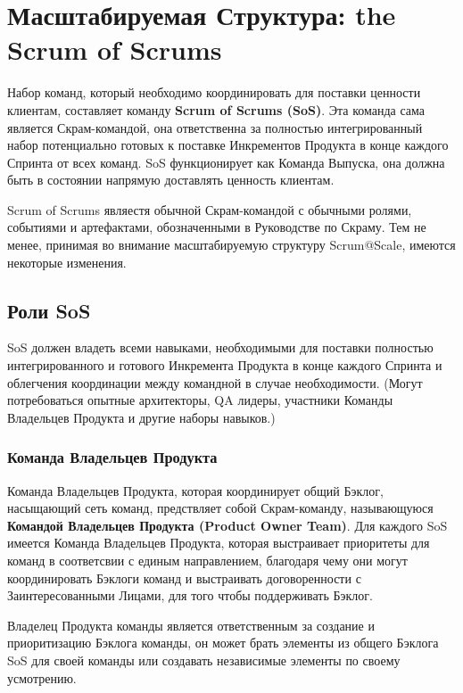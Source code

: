\documentclass[12pt,a4paper,parskip=full]{scrartcl}
\begin{document}
\section{Масштабируемая Структура: the Scrum of Scrums}


Набор команд, который необходимо координировать для поставки ценности клиентам, составляет команду  \textbf{Scrum of Scrums (SoS)}. Эта команда сама является Скрам-командой, она ответственна за полностью интегрированный набор потенциально готовых к поставке Инкрементов Продукта в конце каждого Спринта от всех команд.       SoS функционирует как Команда Выпуска, она должна быть в состоянии напрямую доставлять ценность клиентам.

Scrum of Scrums являестя обычной Скрам-командой с обычными ролями, событиями и артефактами, обозначенными в Руководстве по Скраму. Тем не менее, принимая во внимание масштабируемую структуру Scrum@Scale, имеются некоторые изменения.

\subsection{Роли SoS}

SoS должен владеть всеми навыками, необходимыми для поставки полностью интегрированного и готового Инкремента Продукта в конце каждого Спринта и облегчения координации между командной в случае необходимости. (Могут потребоваться опытные архитекторы, QA лидеры, участники Команды Владельцев Продукта и другие наборы навыков.)  

\subsubsection{Команда Владельцев Продукта}

Команда Владельцев Продукта, которая координирует общий Бэклог, насыщающий сеть команд, предствляет собой Скрам-команду, называющуюся \textbf{Командой Владельцев Продукта (Product Owner Team)}. Для каждого SoS имеется Команда Владельцев Продукта, которая выстраивает приоритеты для команд в соответсвии с единым направлением, благодаря чему они могут координировать Бэклоги команд и выстраивать договоренности с Заинтересованными Лицами, для того чтобы поддерживать Бэклог.

Владелец Продукта команды является ответственным за создание и приоритизацию Бэклога команды, он может брать элементы из общего Бэклога SoS для своей команды или создавать независимые элементы по своему усмотрению.
\end{document}
